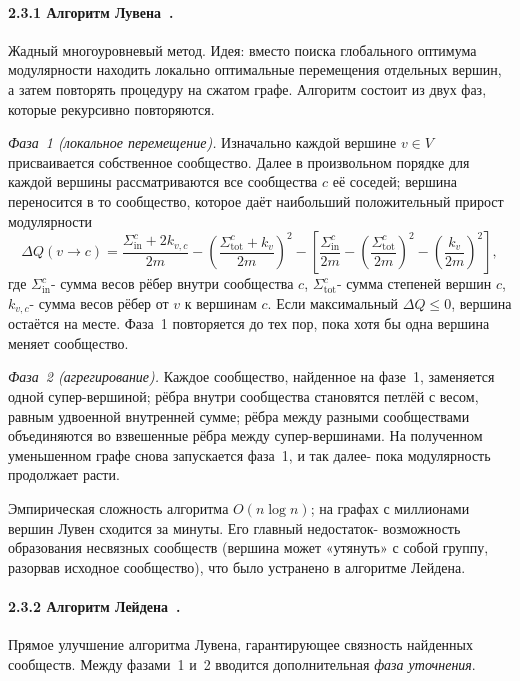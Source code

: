 \documentclass[14pt,a4paper]{extarticle}
\begin{document}
\paragraph{2.3.1 Алгоритм Лувена~\cite{blondel2008}.} Жадный многоуровневый метод. Идея: вместо поиска глобального оптимума модулярности находить локально оптимальные перемещения отдельных вершин, а затем повторять процедуру на сжатом графе. Алгоритм состоит из двух фаз, которые рекурсивно повторяются.

\textit{Фаза~1 (локальное перемещение).} Изначально каждой вершине $v \in V$ присваивается собственное сообщество. Далее в произвольном порядке для каждой вершины рассматриваются все сообщества $c$ её соседей; вершина переносится в то сообщество, которое даёт наибольший положительный прирост модулярности
\begin{equation}
\Delta Q(v \to c) = \frac{\Sigma_{\mathrm{in}}^c + 2 k_{v,c}}{2m} - \left( \frac{\Sigma_{\mathrm{tot}}^c + k_v}{2m} \right)^2 - \left[ \frac{\Sigma_{\mathrm{in}}^c}{2m} - \left( \frac{\Sigma_{\mathrm{tot}}^c}{2m} \right)^2 - \left( \frac{k_v}{2m} \right)^2 \right],
\end{equation}
где $\Sigma_{\mathrm{in}}^c$- сумма весов рёбер внутри сообщества $c$, $\Sigma_{\mathrm{tot}}^c$- сумма степеней вершин $c$, $k_{v,c}$- сумма весов рёбер от $v$ к вершинам $c$. Если максимальный $\Delta Q \leq 0$, вершина остаётся на месте. Фаза~1 повторяется до тех пор, пока хотя бы одна вершина меняет сообщество.

\textit{Фаза~2 (агрегирование).} Каждое сообщество, найденное на фазе~1, заменяется одной супер-вершиной; рёбра внутри сообщества становятся петлёй с весом, равным удвоенной внутренней сумме; рёбра между разными сообществами объединяются во взвешенные рёбра между супер-вершинами. На полученном уменьшенном графе снова запускается фаза~1, и так далее- пока модулярность продолжает расти.

Эмпирическая сложность алгоритма $O(n \log n)$; на графах с миллионами вершин Лувен сходится за минуты. Его главный недостаток- возможность образования несвязных сообществ (вершина может «утянуть» с собой группу, разорвав исходное сообщество), что было устранено в алгоритме Лейдена.

\paragraph{2.3.2 Алгоритм Лейдена~\cite{traag2019}.} Прямое улучшение алгоритма Лувена, гарантирующее связность найденных сообществ. Между фазами~1 и~2 вводится дополнительная \textit{фаза уточнения}.
\end{document}

